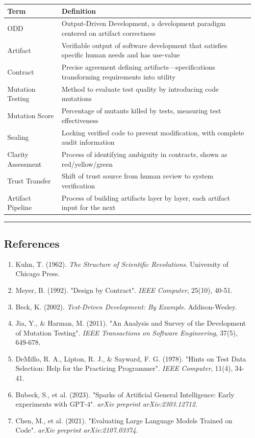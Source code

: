 \documentclass[
]{article}
\begin{document}
\begin{longtable}[]{@{}ll@{}}
\toprule()
Term & Definition \\
\midrule()
\endhead
ODD & Output-Driven Development, a development paradigm centered on
artifact correctness \\
Artifact & Verifiable output of software development that satisfies
specific human needs and has use-value \\
Contract & Precise agreement defining artifacts---specifications
transforming requirements into utility \\
Mutation Testing & Method to evaluate test quality by introducing code
mutations \\
Mutation Score & Percentage of mutants killed by tests, measuring test
effectiveness \\
Sealing & Locking verified code to prevent modification, with complete
audit information \\
Clarity Assessment & Process of identifying ambiguity in contracts,
shown as red/yellow/green \\
Trust Transfer & Shift of trust source from human review to system
verification \\
Artifact Pipeline & Process of building artifacts layer by layer, each
artifact input for the next \\
\bottomrule()
\end{longtable}

\begin{center}\rule{0.5\linewidth}{0.5pt}\end{center}

\hypertarget{references-2}{%
\subsection{References}\label{references-2}}

\begin{enumerate}
\def\labelenumi{\arabic{enumi}.}
\item
  Kuhn, T. (1962). \emph{The Structure of Scientific Revolutions}.
  University of Chicago Press.
\item
  Meyer, B. (1992). "Design by Contract". \emph{IEEE Computer}, 25(10),
  40-51.
\item
  Beck, K. (2002). \emph{Test-Driven Development: By Example}.
  Addison-Wesley.
\item
  Jia, Y., \& Harman, M. (2011). "An Analysis and Survey of the
  Development of Mutation Testing". \emph{IEEE Transactions on Software
  Engineering}, 37(5), 649-678.
\item
  DeMillo, R. A., Lipton, R. J., \& Sayward, F. G. (1978). "Hints on
  Test Data Selection: Help for the Practicing Programmer". \emph{IEEE
  Computer}, 11(4), 34-41.
\item
  Bubeck, S., et al. (2023). "Sparks of Artificial General Intelligence:
  Early experiments with GPT-4". \emph{arXiv preprint arXiv:2303.12712}.
\item
  Chen, M., et al. (2021). "Evaluating Large Language Models Trained on
  Code". \emph{arXiv preprint arXiv:2107.03374}.
\end{enumerate}
\end{document}
